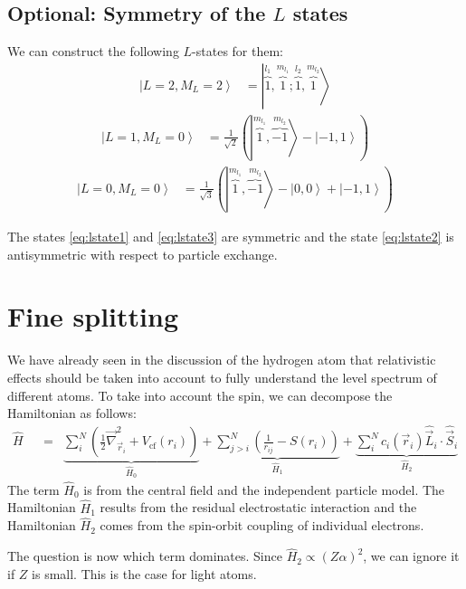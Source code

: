 \documentclass[10pt]{article}
\newcommand{\ket}[1]{\ensuremath{\left|#1\right\rangle}}
\begin{document}
\subsection{Optional: Symmetry of the $L$ states}
We can construct the following $L$-states for them:
\begin{align}
\ket{L=2,M_L=2} &= \ket{\overbrace{1}^{l_1},\overbrace{1}^{m_{l_1}};\overbrace{1}^{l_2},\overbrace{1}^{m_{l_2}}} \label{eq:lstate1}
\end{align}
\begin{align}
\ket{L=1,M_L=0} &= \frac{1}{\sqrt{2}} ( \ket{\overbrace{1}^{m_{l_1}},\overbrace{-1}^{m_{l_2}}} - \ket{-1,1} ) \label{eq:lstate2}
\end{align}
\begin{align}
\ket{L=0,M_L=0} &= \frac{1}{\sqrt{3}}(\ket{\overbrace{1}^{m_{l_1}},\overbrace{-1}^{m_{l_2}}} - \ket{0,0} + \ket{-1,1} ) \label{eq:lstate3}
\end{align}

The states \eqref{eq:lstate1} and \eqref{eq:lstate3} are symmetric and the state \eqref{eq:lstate2} is antisymmetric with respect to particle exchange. 


\section{Fine splitting}

We have already seen in the discussion of the hydrogen atom that relativistic effects should be taken into account to fully understand the level spectrum of different atoms. 
To take into account the spin, we can decompose the Hamiltonian as follows:
%
\begin{align} \label{eq:lsvsjjhamiltonian}
\hat{H} &&=& \underbrace{\sum_i^N \left( \frac{1}{2} \vec{\nabla}^2_{\vec{r}_i} + V_\textrm{cf} (r_i) \right)}_{\hat{H}_0} + \underbrace{\sum^N_{j>i} \left( \frac{1}{r_{ij}} - S(r_i) \right)}_{\hat{H}_1} + \underbrace{\sum_i^N c_i(\vec{r}_i) \hat{\vec{L}}_i \cdot \hat{\vec{S}}_i}_{\hat{H}_2}
\end{align}
The term $\hat{H}_0$ is from the central field and the independent particle model. The Hamiltonian $\hat{H}_1$ results from the residual electrostatic interaction and the Hamiltonian $\hat{H}_2$ comes from the spin-orbit coupling of individual electrons.

The question is now which term dominates. Since $\hat{H}_2 \propto (Z\alpha)^2$, we can ignore it if $Z$ is small. This is the case for light atoms.
\end{document}
